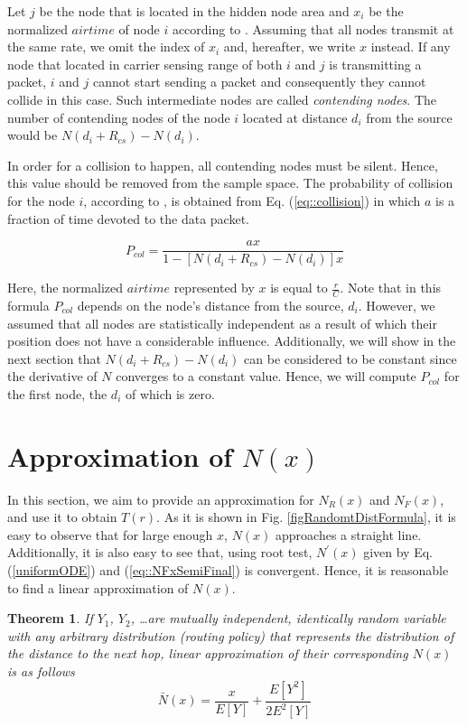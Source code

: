 \documentclass[12pt, draftclsnofoot, onecolumn]{IEEEtran}
\newtheorem{theorem}{Theorem}[section]
\begin{document}
Let $j$ be the node that is located in the hidden node area and $x_i$ be 
the normalized $airtime$ of node $i$ according to \cite{ref1}. 
%
Assuming that all nodes transmit at the same rate, we omit the index of $x_i$ and, 
hereafter, we write $x$ instead. If any node that located in carrier sensing 
range of both $i$ and $j$ is transmitting a packet, $i$ and $j$ cannot start 
sending a packet and consequently they cannot collide in this case. Such
intermediate nodes are called \textit{contending nodes}. The number of contending 
nodes of the node $i$ located at distance $d_i$ from the source would be 
$N(d_i+R_{cs})-N(d_i)$.

In order for a collision to happen, all contending nodes must be silent. Hence, 
this value should be removed from the sample space. The probability of collision 
for the node $i$, according to \cite{ref1}, is obtained from
Eq. (\ref{eq::collision}) in which $a$ is a fraction of time devoted to the data packet. 

\begin{equation}
\label{eq::collision}
P_{col}=\frac{ax}{1-[N(d_i+R_{cs})-N(d_i)]x}
\end{equation}

Here, the normalized $airtime$ represented by $x$ is equal to $\frac{r}{C}$. Note that in this formula $P_{col}$ depends on the node's distance from the source, $d_i$. However, we assumed that all nodes are statistically independent as a result of which their position does not have a considerable influence. Additionally, we will show in the next section that $N(d_i+R_{cs})-N(d_i)$ can be considered to be constant since the derivative of $N$ converges to a constant value. Hence, we will compute $P_{col}$ for the first node, the $d_i$ of which is zero.


\section{Approximation of $N(x)$}
\label{approximation}
In this section, we aim to provide an approximation for $N_R(x)$ and $N_F(x)$, and use 
it to obtain $T(r)$. As it is shown in Fig. \ref{figRandomtDistFormula}, it is easy to observe 
that for large enough $x$, $N(x)$ approaches a straight line. Additionally, 
it is also easy to see that, using root test, $N^{\prime}(x)$ given by 
Eq. (\ref{uniformODE}) and (\ref{eq::NFxSemiFinal}) is convergent. Hence, it is reasonable to find a linear approximation of $N(x)$.


\begin{theorem}
If $Y_1$, $Y_2$, \ldots are mutually independent, identically random variable with any arbitrary distribution (routing policy) that represents the distribution of the distance to the next hop, linear approximation of their corresponding $N(x)$ is as follows
\begin{equation}
\label{eq::GenerallinearApprox}
\bar{N} (x) = \frac{x}{E[Y]} + \frac{E[Y^2]}{2E^2[Y]} 
\end{equation} 
\end{theorem}
\end{document}
